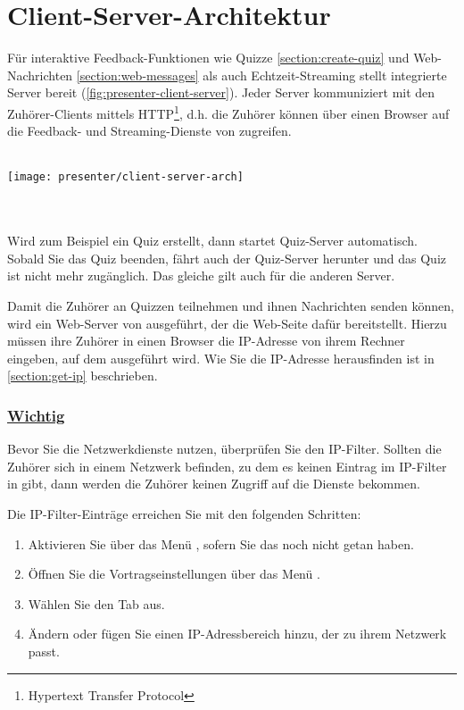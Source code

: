 \section{Client-Server-Architektur}
Für interaktive Feedback-Funktionen wie Quizze \ref{section:create-quiz} und Web-Nachrichten \ref{section:web-messages} als auch Echtzeit-Streaming stellt \lectPresenter{} integrierte Server bereit (\autoref{fig:presenter-client-server}). Jeder Server kommuniziert mit den Zuhörer-Clients mittels HTTP\footnote{Hypertext Transfer Protocol}, d.h. die Zuhörer können über einen Browser auf die Feedback- und Streaming-Dienste von \lectPresenter{} zugreifen.
\\\\
\begin{minipage}{\textwidth}
	\centering
	\captionsetup{type=figure}
	\texttt{[image: presenter/client-server-arch]}
  	\label{fig:presenter-client-server}
\end{minipage}
\\\\
Wird zum Beispiel ein Quiz erstellt, dann startet Quiz-Server automatisch. Sobald Sie das Quiz beenden, fährt auch der Quiz-Server herunter und das Quiz ist nicht mehr zugänglich. Das gleiche gilt auch für die anderen Server.

Damit die Zuhörer an Quizzen teilnehmen und ihnen Nachrichten senden können, wird ein Web-Server von \lectPresenter{} ausgeführt, der die Web-Seite dafür bereitstellt. Hierzu müssen ihre Zuhörer in einen Browser die IP-Adresse von ihrem Rechner eingeben, auf dem \lectPresenter{} ausgeführt wird. Wie Sie die IP-Adresse herausfinden ist in \autoref{section:get-ip} beschrieben.

\subsubsection*{\underline{Wichtig}}
Bevor Sie die Netzwerkdienste nutzen, überprüfen Sie den IP-Filter. Sollten die Zuhörer sich in einem Netzwerk befinden, zu dem es keinen Eintrag im IP-Filter in \lectPresenter{} gibt, dann werden die Zuhörer keinen Zugriff auf die Dienste bekommen.

Die IP-Filter-Einträge erreichen Sie mit den folgenden Schritten:
\begin{enumerate}
	\item Aktivieren Sie  über das Menü , sofern Sie das noch nicht getan haben.
	\item Öffnen Sie die Vortragseinstellungen über das Menü .
	\item Wählen Sie den Tab  aus.
	\item Ändern oder fügen Sie einen IP-Adressbereich hinzu, der zu ihrem Netzwerk passt.
\end{enumerate}

